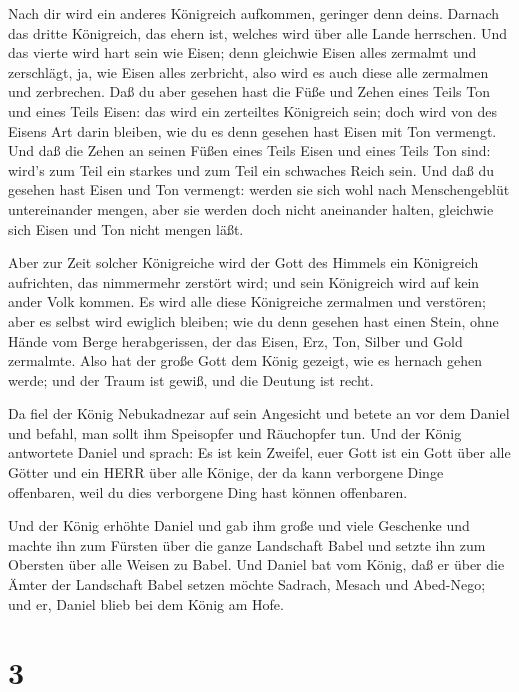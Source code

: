 Nach dir wird ein anderes Königreich aufkommen, geringer
denn deins. Darnach das dritte Königreich, das ehern ist, welches wird
über alle Lande herrschen.  Und das vierte wird hart sein
wie Eisen; denn gleichwie Eisen alles zermalmt und zerschlägt, ja, wie
Eisen alles zerbricht, also wird es auch diese alle zermalmen und
zerbrechen.  Daß du aber gesehen hast die Füße und Zehen
eines Teils Ton und eines Teils Eisen: das wird ein zerteiltes
Königreich sein; doch wird von des Eisens Art darin bleiben, wie du es
denn gesehen hast Eisen mit Ton vermengt.  Und daß die
Zehen an seinen Füßen eines Teils Eisen und eines Teils Ton sind: wird's
zum Teil ein starkes und zum Teil ein schwaches Reich sein.
 Und daß du gesehen hast Eisen und Ton vermengt: werden sie
sich wohl nach Menschengeblüt untereinander mengen, aber sie werden doch
nicht aneinander halten, gleichwie sich Eisen und Ton nicht mengen läßt.

 Aber zur Zeit solcher Königreiche wird der Gott des
Himmels ein Königreich aufrichten, das nimmermehr zerstört wird; und
sein Königreich wird auf kein ander Volk kommen. Es wird alle diese
Königreiche zermalmen und verstören; aber es selbst wird ewiglich
bleiben;  wie du denn gesehen hast einen Stein, ohne Hände
vom Berge herabgerissen, der das Eisen, Erz, Ton, Silber und Gold
zermalmte. Also hat der große Gott dem König gezeigt, wie es hernach
gehen werde; und der Traum ist gewiß, und die Deutung ist recht.

 Da fiel der König Nebukadnezar auf sein Angesicht und
betete an vor dem Daniel und befahl, man sollt ihm Speisopfer und
Räuchopfer tun.  Und der König antwortete Daniel und
sprach: Es ist kein Zweifel, euer Gott ist ein Gott über alle Götter und
ein HERR über alle Könige, der da kann verborgene Dinge offenbaren, weil
du dies verborgene Ding hast können offenbaren.

 Und der König erhöhte Daniel und gab ihm große und viele
Geschenke und machte ihn zum Fürsten über die ganze Landschaft Babel und
setzte ihn zum Obersten über alle Weisen zu Babel.  Und
Daniel bat vom König, daß er über die Ämter der Landschaft Babel setzen
möchte Sadrach, Mesach und Abed-Nego; und er, Daniel blieb bei dem König
am Hofe.

\hypertarget{section-2}{%
\section{3}\label{section-2}}

